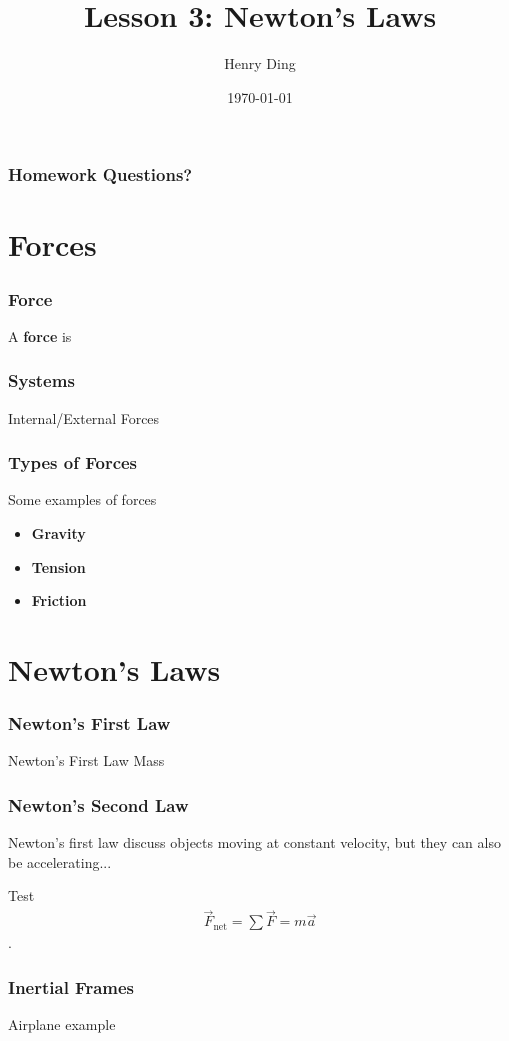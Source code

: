 \documentclass[20pt]{beamer}
\author{Henry Ding}
\date{\today}
\title{Lesson 3: Newton's Laws}
\begin{document}
\frame{\titlepage}

\begin{frame}
	\frametitle{Homework Questions?}
\end{frame}

\section{Forces}

\begin{frame}
	\frametitle{Force}
	\begin{definition}
		A \textbf{force} is
	\end{definition}
\end{frame}

\begin{frame}
	\frametitle{Systems}
	Internal/External Forces
\end{frame}

\begin{frame}
	\frametitle{Types of Forces}
	Some examples of forces
	\begin{itemize}
		\item \textbf{Gravity}
		\item \textbf{Tension}
		\item \textbf{Friction}
	\end{itemize}
\end{frame}

\section{Newton's Laws}

\begin{frame}
	\frametitle{Newton's First Law}
	Newton's First Law
	Mass
\end{frame}

\begin{frame}
	\frametitle{Newton's Second Law}
	Newton's first law discuss objects moving at constant velocity, but they can also be accelerating...
	\begin{theorem}
		Test
		\begin{align*}
			\vec{F}_\mathrm{net} = \sum \vec{F} = m \vec{a}
		\end{align*}.
	\end{theorem}
\end{frame}

\begin{frame}
	\frametitle{Inertial Frames}
	Airplane example
\end{frame}
\end{document}
